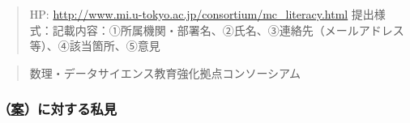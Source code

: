 \documentclass[
]{bxjsbook}
\theoremstyle{definition}
\theoremstyle{definition}
\theoremstyle{definition}
\theoremstyle{definition}
\theoremstyle{remark}
\begin{document}
\begin{quote}
HP: \url{http://www.mi.u-tokyo.ac.jp/consortium/mc_literacy.html}
提出様式：記載内容：①所属機関・部署名、②氏名、③連絡先（メールアドレス等）、④該当箇所、⑤意見
\end{quote}

\begin{quote}
数理・データサイエンス教育強化拠点コンソーシアム
\end{quote}

\hypertarget{ux6848ux306bux5bfeux3059ux308bux79c1ux898b}{%
\subsubsection{\texorpdfstring{（\href{http://www.mi.u-tokyo.ac.jp/consortium/pdf/model_curriculum.pdf}{案}）に対する私見}{（案）に対する私見}}\label{ux6848ux306bux5bfeux3059ux308bux79c1ux898b}}
\end{document}
